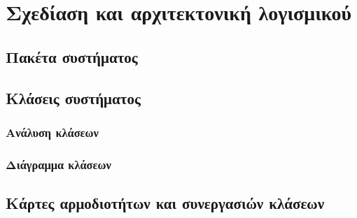 \chapter{Σχεδίαση και αρχιτεκτονική λογισμικού}
\label{ch:architecture}


\section{Πακέτα συστήματος}
\label{sec:packages}
\section{Κλάσεις συστήματος}
\label{sec:classes}
\subsection{Ανάλυση κλάσεων}
\label{subsec:classAnalysis}
\subsection{Διάγραμμα κλάσεων}
\label{subsec:ClassUML}
\section{Κάρτες αρμοδιοτήτων και συνεργασιών κλάσεων}
\label{sec:crc}